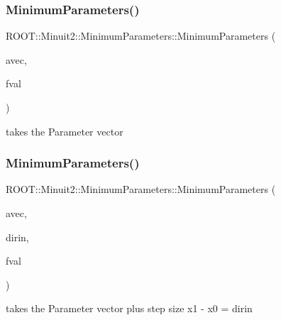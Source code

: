 \subsubsection{\texorpdfstring{MinimumParameters()}{MinimumParameters()}\hspace{0.1cm}{\footnotesize\ttfamily [2/12]}}
{\footnotesize\ttfamily R\+O\+O\+T\+::\+Minuit2\+::\+Minimum\+Parameters\+::\+Minimum\+Parameters (\begin{DoxyParamCaption}\item[{const \mbox{\hyperlink{namespaceROOT_1_1Minuit2_a62ed97730a1ca8d3fbaec64a19aa11c9}{Mn\+Algebraic\+Vector}} \&}]{avec,  }\item[{double}]{fval }\end{DoxyParamCaption})\hspace{0.3cm}{\ttfamily [inline]}}

takes the Parameter vector \mbox{\label{classROOT_1_1Minuit2_1_1MinimumParameters_ad771c737e802f1f6a6f01b94dd249ef7}} 
\subsubsection{\texorpdfstring{MinimumParameters()}{MinimumParameters()}\hspace{0.1cm}{\footnotesize\ttfamily [3/12]}}
{\footnotesize\ttfamily R\+O\+O\+T\+::\+Minuit2\+::\+Minimum\+Parameters\+::\+Minimum\+Parameters (\begin{DoxyParamCaption}\item[{const \mbox{\hyperlink{namespaceROOT_1_1Minuit2_a62ed97730a1ca8d3fbaec64a19aa11c9}{Mn\+Algebraic\+Vector}} \&}]{avec,  }\item[{const \mbox{\hyperlink{namespaceROOT_1_1Minuit2_a62ed97730a1ca8d3fbaec64a19aa11c9}{Mn\+Algebraic\+Vector}} \&}]{dirin,  }\item[{double}]{fval }\end{DoxyParamCaption})\hspace{0.3cm}{\ttfamily [inline]}}

takes the Parameter vector plus step size x1 -\/ x0 = dirin \mbox{\label{classROOT_1_1Minuit2_1_1MinimumParameters_a1e7d7b8ed914bec0a2e4f68642b9a377}} 
